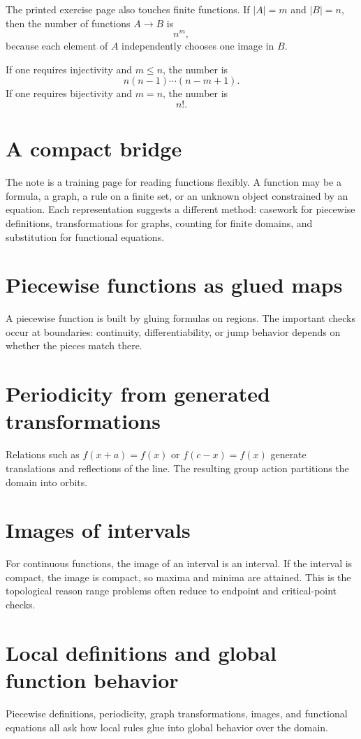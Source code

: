 The printed exercise page also touches finite functions.  If $|A|=m$ and $|B|=n$, then the number of functions $A\to B$ is
\[
  n^m,
\]
because each element of $A$ independently chooses one image in $B$.

If one requires injectivity and $m\le n$, the number is
\[
  n(n-1)\cdots(n-m+1).
\]
If one requires bijectivity and $m=n$, the number is
\[
  n!.
\]

\section{A compact bridge}

The note is a training page for reading functions flexibly.  A function may be a formula, a graph, a rule on a finite set, or an unknown object constrained by an equation.  Each representation suggests a different method: casework for piecewise definitions, transformations for graphs, counting for finite domains, and substitution for functional equations.

\section{Piecewise functions as glued maps}
A piecewise function is built by gluing formulas on regions.  The important checks occur at boundaries: continuity, differentiability, or jump behavior depends on whether the pieces match there.
\section{Periodicity from generated transformations}
Relations such as \(f(x+a)=f(x)\) or \(f(c-x)=f(x)\) generate translations and reflections of the line.  The resulting group action partitions the domain into orbits.
\section{Images of intervals}
For continuous functions, the image of an interval is an interval.  If the interval is compact, the image is compact, so maxima and minima are attained.  This is the topological reason range problems often reduce to endpoint and critical-point checks.
\section{Local definitions and global function behavior}
Piecewise definitions, periodicity, graph transformations, images, and functional equations all ask how local rules glue into global behavior over the domain.

